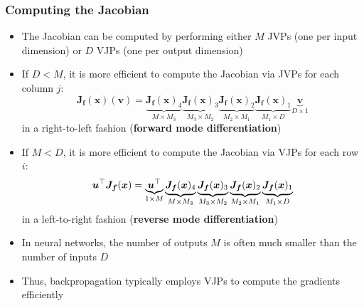 \documentclass[smaller, handout]{beamer}
\begin{document}
\begin{frame}
  \frametitle{Computing the Jacobian}\pause

  \begin{itemize}
    \item The Jacobian can be computed by performing either $M$ JVPs (one per input dimension) or $D$ VJPs (one per output dimension)
    \item If $D < M$, it is more efficient to compute the Jacobian via JVPs for each column $j$:
      \begin{equation}
        \bm J_{\bm f}(\bm x)(\bm v) = \underbrace{\bm J_{\bm f}(\bm x)_4}_{M \times M_3} \underbrace{\bm J_{\bm f}(\bm x)_3}_{M_3 \times M_2} \underbrace{\bm J_{\bm f}(\bm x)_2}_{M_2 \times M_1} \underbrace{\bm J_{\bm f}(\bm x)_1}_{M_1 \times D} \underbrace{\bm v}_{D \times 1}
      \end{equation}
      in a right-to-left fashion (\textbf{forward mode differentiation})
    \item If $M < D$, it is more efficient to compute the Jacobian via VJPs for each row $i$:
      \begin{equation}
        \bm u^{\top} \bm J_{\bm f}(\bm x) = \underbrace{\bm u^{\top}}_{1 \times M} \underbrace{\bm J_{\bm f}(\bm x)_4}_{M \times M_3} \underbrace{\bm J_{\bm f}(\bm x)_3}_{M_3 \times M_2} \underbrace{\bm J_{\bm f}(\bm x)_2}_{M_2 \times M_1} \underbrace{\bm J_{\bm f}(\bm x)_1}_{M_1 \times D}
      \end{equation}
      in a left-to-right fashion (\textbf{reverse mode differentiation})
    \item In neural networks, the number of outputs $M$ is often much smaller than the number of inputs $D$
    \item Thus, backpropagation typically employs VJPs to compute the gradients efficiently
  \end{itemize}
\end{frame}
\end{document}
